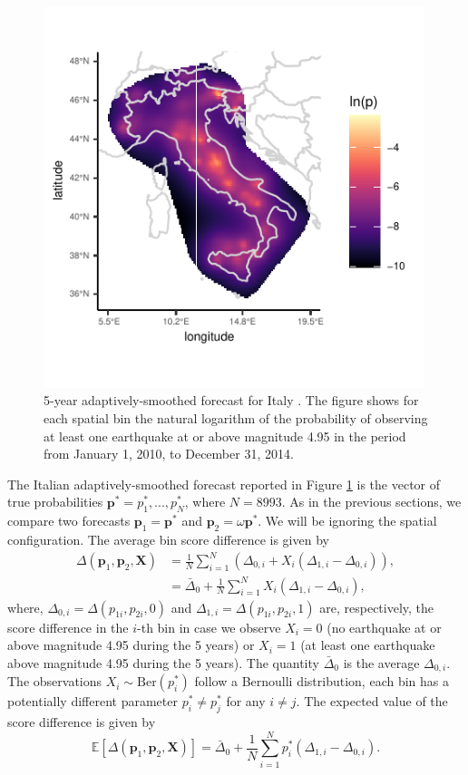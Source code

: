 \documentclass[referee,sn-basic]{sn-jnl}
\theoremstyle{thmstyleone}%
\theoremstyle{thmstyletwo}%
\theoremstyle{thmstylethree}%
\begin{document}
\begin{figure}
  \includegraphics[width = 0.99\textwidth]{figure9.pdf}
\caption{5-year adaptively-smoothed forecast for Italy \citep{werner2010adaptively}. The figure shows for each spatial bin the natural logarithm of the probability of observing at least one earthquake at or above magnitude 4.95 in the period from January 1, 2010, to December 31, 2014.}
\label{fig:9}
\end{figure}

The Italian adaptively-smoothed forecast reported in Figure \ref{fig:9} is the vector of true probabilities $\mathbf p^* = p^*_1,...,p^*_N$, where $N = 8993$. As in the previous sections, we compare two forecasts $\mathbf p_1 = \mathbf p^*$ and $\mathbf p_2 = \omega \mathbf p^*$. We will be ignoring the spatial configuration. The average bin score difference is given by
$$
\begin{aligned}
\Delta(\mathbf p_1, \mathbf p_2, \mathbf X) & = \frac{1}{N}\sum_{i=1}^N (\Delta_{0,i} + X_i(\Delta_{1,i} - \Delta_{0,i})), \\ 
& = \bar \Delta_0 + \frac{1}{N}\sum_{i=1}^N X_i(\Delta_{1,i} - \Delta_{0,i}),
\end{aligned}
$$
where, $\Delta_{0,i} = \Delta(p_{1i}, p_{2i}, 0)$ and $\Delta_{1,i} = \Delta(p_{1i}, p_{2i}, 1)$ are, respectively, the score difference in the $i$-th bin in case we observe $X_i = 0$ (no earthquake at or above magnitude 4.95 during the 5 years) or $X_i = 1$ (at least one earthquake above magnitude 4.95 during the 5 years). The quantity $\bar \Delta_0$ is the average $\Delta_{0,i}$. The observations $X_i \sim \text{Ber}(p^*_i)$ follow a Bernoulli distribution, each bin has a potentially different parameter $p^*_i \neq p^*_j$ for any $i \neq j$. The expected value of the score difference is given by
$$
\mathbb E[\Delta(\mathbf p_1, \mathbf p_2, \mathbf X)] = \bar \Delta_0 + \frac{1}{N}\sum_{i=1}^N p^*_i(\Delta_{1,i} - \Delta_{0,i}).
$$
\end{document}
